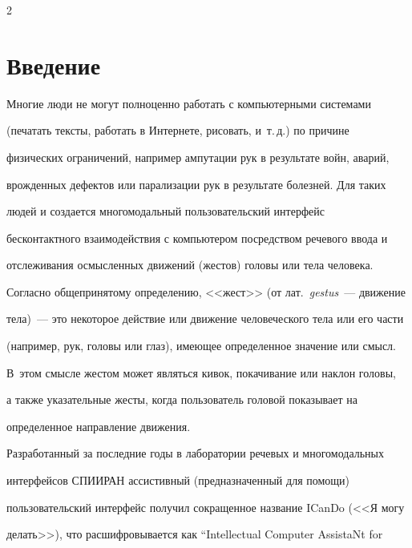       \begin{multicols}{2}





            \label{st\stat}





\section{Введение}


  


  Многие люди не могут полноценно работать с компьютерными системами 


(печатать тексты, работать в Интернете, рисовать, и~т.\,д.) по причине 


физических ограничений, например ампутации рук в результате войн, аварий, 


врожденных дефектов или парализации рук в результате болезней. Для таких 


людей и создается многомодальный пользовательский интерфейс 


бесконтактного взаимодействия с компьютером посредством речевого ввода и 


отслеживания осмысленных движений (жестов) головы или тела человека. 


Согласно общепринятому определению, <<жест>> (от лат.\ \textit{gestus}~--- движение 


тела)~--- это некоторое действие или движение человеческого тела или его части 


(например, рук, головы или глаз), имеющее определенное значение или смысл. 


В~этом смысле жестом может являться кивок, покачивание или наклон головы, 


а также указательные жесты, когда пользователь головой показывает на 


определенное направление движения. 


  


  Разработанный за последние годы в лаборатории речевых и многомодальных 


интерфейсов \mbox{СПИИРАН} ассистивный (предназначенный для помощи) 


пользовательский интерфейс получил сокращенное название \mbox{ICanDo} (<<Я могу 


делать>>), что рас\-шиф\-ро\-вы\-ва\-ет\-ся как ``Intellectual Computer AssistaNt for 



\end{multicols}
